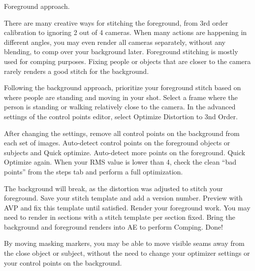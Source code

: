 \begin{fullwidth}

{\large Foreground approach. \par}

There are many creative ways for stitching the foreground, from 3rd order calibration to ignoring 2 out of 4 cameras. When many actions are happening in different angles, you may even render all cameras separately, without any blending, to comp over your background later. Foreground stitching is mostly used for comping purposes. Fixing people or objects that are closer to the camera rarely renders a good stitch for the background.

\clearpage

Following the background approach, prioritize your foreground stitch based on where people are standing and moving in your shot. Select a frame where the person is standing or walking relatively close to the camera. In the advanced settings of the control points editor, select Optimize Distortion to 3nd Order.


After changing the settings, remove all control points on the background from each set of images. Auto-detect control points on the foreground objects or subjects and Quick optimize. Auto-detect more points on the foreground. Quick Optimize again. When your RMS value is lower than 4, check the clean “bad points” from the steps tab and perform a full optimization.


\clearpage

The background will break, as the distortion was adjusted to stitch your foreground. Save your stitch template and add a version number. Preview with AVP and fix this template until satisfied. Render your foreground work. You may need to render in sections with a stitch template per section fixed. Bring the background and foreground renders into AE to perform Comping. Done!


\tip By moving masking markers, you may be able to move visible seams away from the close object or subject, without the need to change your optimizer settings or your control points on the background.


\clearpage
\end{fullwidth}